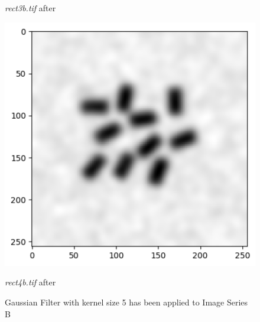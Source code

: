 \documentclass[runningheads]{llncs}
\begin{document}
\begin{figure}[h!]
\begin{minipage}[h]{0.47\linewidth}
\begin{center}
\caption{\emph{rect3b.tif} after}
\label{hb7-Gaussian and Kernel 5}
\end{center}
\end{minipage}
\hfill
\begin{minipage}[h]{0.47\linewidth}
\begin{center}
\includegraphics[width=1\linewidth]{Report/Result_Images/image_hb8.png} 
\caption{\emph{rect4b.tif} after}
\label{hb8-Gaussian and Kernel 5}
\end{center}
\end{minipage}
\caption*{Gaussian Filter with kernel size 5 has been applied to Image Series B}
\label{hb5-8 Gaussian5}
\end{figure}


\newpage
\end{document}
